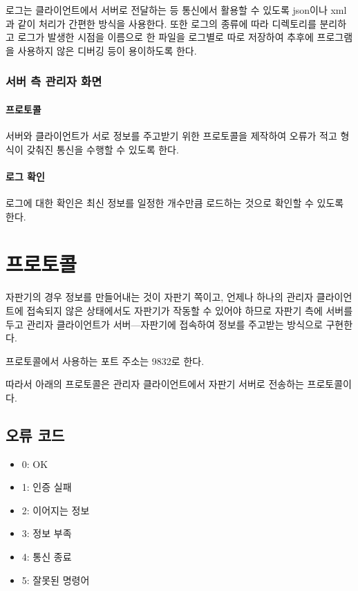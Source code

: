 \documentclass{oblivoir}
\begin{document}
    로그는 클라이언트에서 서버로 전달하는 등 통신에서 활용할 수 있도록
    json이나 xml과 같이 처리가 간편한 방식을 사용한다.
    또한 로그의 종류에 따라 디렉토리를 분리하고 로그가 발생한 시점을
    이름으로 한 파일을 로그별로 따로 저장하여 추후에
    프로그램을 사용하지 않은 디버깅 등이 용이하도록 한다.

    \subsubsection{서버 측 관리자 화면}

    \paragraph{프로토콜}

    서버와 클라이언트가 서로 정보를 주고받기 위한 프로토콜을 제작하여
    오류가 적고 형식이 갖춰진 통신을 수행할 수 있도록 한다.

    \paragraph{로그 확인}

    로그에 대한 확인은 최신 정보를 일정한 개수만큼 로드하는 것으로
    확인할 수 있도록 한다.

    \section{프로토콜}
    \label{sec:protocol}

    자판기의 경우 정보를 만들어내는 것이 자판기 쪽이고,
    언제나 하나의 관리자 클라이언트에 접속되지 않은 상태에서도
    자판기가 작동할 수 있어야 하므로
    자판기 측에 서버를 두고 관리자 클라이언트가 서버---자판기에 접속하여
    정보를 주고받는 방식으로 구현한다.

    프로토콜에서 사용하는 포트 주소는 9832로 한다.

    따라서 아래의 프로토콜은 관리자 클라이언트에서 자판기 서버로
    전송하는 프로토콜이다.

    \subsection{오류 코드}

    \begin{itemize}
        \item 0: OK
        \item 1: 인증 실패
        \item 2: 이어지는 정보
        \item 3: 정보 부족
        \item 4: 통신 종료
        \item 5: 잘못된 명령어
    \end{itemize}
\end{document}
